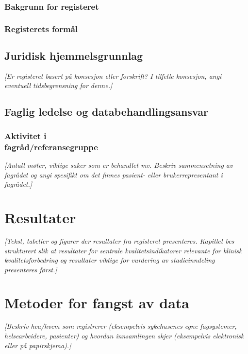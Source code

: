 \documentclass[norsk, a4paper, twocolumn]{report}
\newcommand{\guide}[1] {
	\textit{[\textcolor{guidegray}{#1}]}
	}
\begin{document}
\subsection{Bakgrunn for registeret}\label{sec:bak}
\subsection{Registerets formål}\label{sec:for}

\section{Juridisk hjemmelsgrunnlag}\label{cha:jur}
\guide{Er registeret basert på konsesjon eller forskrift? I tilfelle
konsesjon, angi eventuell tidsbegrensning for denne.}

\section{Faglig ledelse og databehandlingsansvar}\label{cha:led}
\subsection{Aktivitet i\\fagråd/referansegruppe}
\guide{Antall møter, viktige saker som er behandlet mv. Beskriv sammensetning av
fagrådet og angi spesifikt om det finnes pasient- eller brukerrepresentant i
fagrådet.}




\chapter{Resultater}\label{cha:res}
\guide{Tekst, tabeller og figurer der resultater fra registeret
presenteres. Kapitlet bes strukturert slik at resultater for sentrale
kvalitetsindikatorer relevante for klinisk kvalitetsforbedring og
resultater viktige for vurdering av stadieinndeling presenteres først.}




\chapter{Metoder for fangst av data}\label{cha:metoder}
\guide{Beskriv hva/hvem som registrerer (eksempelvis sykehusenes egne
fagsystemer, helsearbeidere, pasienter) og hvordan innsamlingen skjer
(eksempelvis elektronisk eller på papirskjema).}
\end{document}
